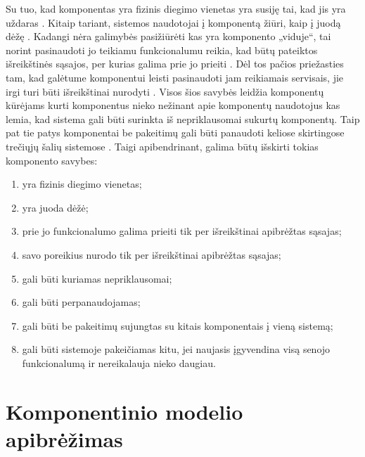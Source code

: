 Su tuo, kad komponentas yra fizinis diegimo vienetas yra susiję
tai, kad jis yra uždaras
\cite[36]{cs-beyond-object-oriented-programming}. Kitaip tariant,
sistemos naudotojai į komponentą žiūri, kaip į juodą
dėžę \cite[2]{Gill:2003:CMF:966221.966237}.
Kadangi nėra galimybės pasižiūrėti kas yra komponento „viduje“,
tai norint pasinaudoti jo teikiamu funkcionalumu reikia, kad būtų
pateiktos išreikštinės sąsajos, per kurias galima prie jo
prieiti
\cites[387]{objects-components-and-frameworks-with-uml}%
[36]{cs-beyond-object-oriented-programming}. Dėl tos
pačios priežasties tam, kad galėtume komponentui leisti pasinaudoti
jam reikiamais servisais, jie irgi turi būti išreikštinai nurodyti
\cites[387]{objects-components-and-frameworks-with-uml}%
[36]{cs-beyond-object-oriented-programming}. Visos šios
savybės leidžia komponentų kūrėjams kurti komponentus nieko
nežinant apie komponentų naudotojus
\cites[2]{Gill:2003:CMF:966221.966237}%
[139]{meyer1999components}
kas lemia, kad sistema gali būti surinkta iš nepriklausomai sukurtų
komponentų. Taip pat tie patys komponentai be pakeitimų gali būti
panaudoti keliose skirtingose trečiųjų šalių sistemose
\cites[388]{objects-components-and-frameworks-with-uml}%
[36]{cs-beyond-object-oriented-programming}. Taigi
apibendrinant, galima būtų išskirti tokias komponento savybes:
\begin{enumerate}
  \item \label{com:exe:deployment} yra fizinis diegimo vienetas;
  \item \label{com:exe:blackbox} yra juoda dėžė;
  \item \label{com:exe:interfaceprovider} prie jo funkcionalumo galima
    prieiti tik per išreikštinai apibrėžtas sąsajas;
  \item \label{com:exe:interfaceuser} savo poreikius nurodo tik per
    išreikštinai apibrėžtas sąsajas;
  \item \label{com:exe:independent} gali būti kuriamas nepriklausomai;
  \item \label{com:exe:reusable} gali būti perpanaudojamas;
  \item \label{com:exe:composed} gali būti be pakeitimų sujungtas su
    kitais komponentais į vieną sistemą;
  \item \label{com:exe:interchangable} gali būti sistemoje
    pakeičiamas kitu, jei naujasis įgyvendina visą senojo
    funkcionalumą ir nereikalauja nieko daugiau.
\end{enumerate}

\section{Komponentinio modelio apibrėžimas}

